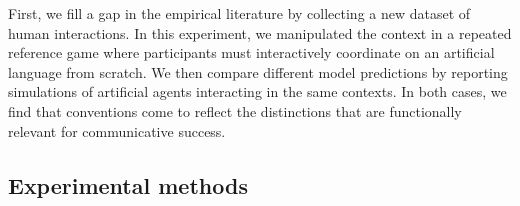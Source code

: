 First, we fill a gap in the empirical literature by collecting a new dataset of human interactions.
In this experiment, we manipulated the context in a repeated reference game where participants must interactively coordinate on an artificial language from scratch. %
We then compare different model predictions by reporting simulations of artificial agents interacting in the same contexts.
In both cases, we find that conventions come to reflect the distinctions that are functionally relevant for communicative success. 






			
\subsection{Experimental methods}

